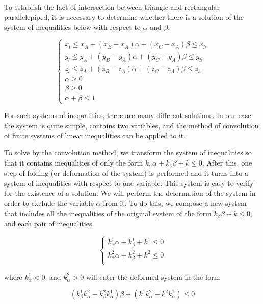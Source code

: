 \documentclass[
11pt,%
tightenlines,%
twoside,%
onecolumn,%
nofloats,%
nobibnotes,%
nofootinbib,%
superscriptaddress,%
noshowpacs,%
centertags]%
{revtex4}
\begin{document}
To establish the fact of intersection between triangle and rectangular parallelepiped, it is necessary to determine whether there is a solution of the system of inequalities below with respect to $\alpha$ and $\beta$:

\begin{equation}
\begin{cases}
x_l \le x_A + (x_B - x_A)\alpha + (x_C - x_A)\beta \le x_h \\
y_l \le y_A + (y_B - y_A)\alpha + (y_C - y_A)\beta \le y_h \\
z_l \le z_A + (z_B - z_A)\alpha + (z_C - z_A)\beta \le z_h \\
\alpha \ge 0 \\
\beta \ge 0 \\
\alpha + \beta \le 1
\end{cases}
\end{equation}

For such systems of inequalities, there are many different solutions.
In our case, the system is quite simple, contains two variables, and the method of convolution of finite systems of linear inequalities can be applied to it.

To solve by the convolution method, we transform the system of inequalities so that it contains inequalities of only the form $k_{\alpha}\alpha + k_{\beta}\beta + k \le 0$.
After this, one step of folding (or deformation of the system) is performed and it turns into a system of inequalities with respect to one variable.
This system is easy to verify for the existence of a solution.
We will perform the deformation of the system in order to exclude the variable $\alpha$ from it.
To do this, we compose a new system that includes all the inequalities of the original system of the form $k_{\beta}\beta + k \le 0$, and each pair of inequalities

\begin{equation}
\begin{cases}
k_{\alpha}^1 \alpha + k_{\beta}^1 + k^1 \le 0 \\
k_{\alpha}^2 \alpha + k_{\beta}^2 + k^2 \le 0 \\
\end{cases}
\end{equation}

where $k_{\alpha}^1 < 0$, and $k_{\alpha}^2 > 0$ will enter the deformed system in the form

\begin{equation}
(k_{\beta}^1 k_{\alpha}^2 - k_{\beta}^2 k_{\alpha}^1)\beta + (k^1 k_{\alpha}^2 - k^2 k_{\alpha}^1) \le 0
\end{equation}
\end{document}
